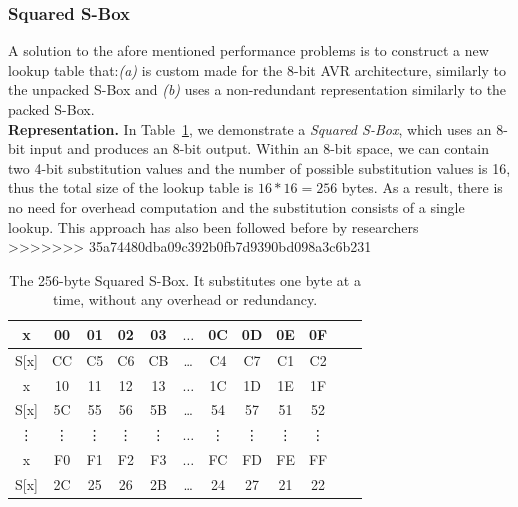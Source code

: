 \documentclass[11pt]{article}
\begin{document}
\subsubsection{Squared S-Box}\label{ssbox}
A solution to the afore mentioned performance problems is to construct a new lookup table that:\emph{(a)} is custom made for the 8-bit AVR architecture, similarly to the unpacked S-Box and \emph{(b)} uses a non-redundant representation similarly to the packed S-Box.\\
\textbf{Representation.} In Table~\ref{squared_sbox}, we demonstrate a \emph{Squared S-Box}, which uses an 8-bit input and produces an 8-bit output. Within an 8-bit space, we can contain two 4-bit substitution values and the number of possible substitution values is 16, thus the total size of the lookup table is $16*16=256$ bytes. As a result, there is no need for overhead computation and the substitution consists of a single lookup. This approach has also been followed before by researchers~\cite{eisenbarth2012compact}\\
>>>>>>> 35a74480dba09c392b0fb7d9390bd098a3c6b231
\begin{table}[h]
\footnotesize
\centering
\begin{tabular}{| c | c  | c | c | c  | c  | c | c | c  | c | c | c |}
\hline
  x & 00 & 01 & 02 & 03  &  $\dots$  & 0C & 0D & 0E & 0F   \\
\hline
 S[x] & CC & C5 & C6 & CB & \dots & C4 & C7 & C1 & C2   \\
\hline
  x & 10 & 11 & 12 & 13  &  $\dots$  & 1C & 1D & 1E & 1F   \\
\hline
 S[x] & 5C & 55 & 56 & 5B & \dots & 54 & 57 & 51 & 52   \\
\hline
  \vdots & \vdots & \vdots & \vdots & \vdots  &  $\dots$  & \vdots &\vdots & \vdots & \vdots   \\
\hline
  x & F0 & F1 & F2 & F3  &  $\dots$  & FC & FD & FE & FF   \\
\hline
 S[x] & 2C & 25 & 26 & 2B & \dots & 24 & 27 & 21 & 22   \\


\hline
\end{tabular}
 \caption{\footnotesize The 256-byte Squared S-Box. It substitutes one byte at a time, without any overhead or redundancy.}
 \label{squared_sbox}
\end{table}
\end{document}
